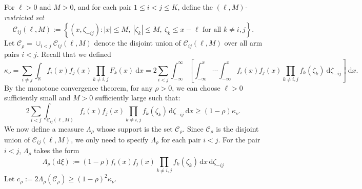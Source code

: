 \documentclass[10pt]{article}
\newcommand{\dd}{\mathrm{d}}
\theoremstyle{plain}
\begin{document}
For $\ell > 0$ and $M > 0$, and for each pair $1\leq i < j \leq K$, define the {\em $(\ell,M)$-restricted set}
$$ \mathcal{C}_{ij}(\ell, M) := \left\{ (x, \zeta_{-ij}) : |x| \le M,\ |\zeta_k| \le M,\ \zeta_k \le x - \ell \text{ for all } k \neq i,j \right\}. $$
Let $\mathcal{C}_\rho = \cup_{i<j}\mathcal{C}_{ij}(\ell, M)$ denote the disjoint union of $\mathcal{C}_{ij}(\ell, M)$ over all arm pairs $i < j$. Recall that we defined
$$\kappa_\nu = \sum_{i\neq j}\int_{\mathbb R}f_i(x)f_j(x)\prod_{k\neq i,j}F_k(x) \ \dd x 
=2\sum_{i<j}\int_{-\infty}^{\infty}\left[\int_{-\infty}^{x}\cdots\int_{-\infty}^{x}f_i(x)f_j(x)\prod_{k\neq i,j}f_k(\zeta_k) \ \dd\zeta_{-ij}\right] \ \dd x.$$
By the monotone convergence theorem, for any  $\rho >0$, we can choose $\ell > 0$ sufficiently small and $M > 0$ sufficiently large such that:
$$ 2\sum_{i<j} \int_{\mathcal{C}_{ij}(\ell,M)} f_i(x)f_j(x)\prod_{k \neq i,j} f_k(\zeta_k) \,\dd\zeta_{-ij}\,\dd x \ge (1-\rho)\kappa_\nu. $$
We now define a   measure $\Lambda_\rho$ whose support is the set $\mathcal{C}_\rho$. Since $\mathcal{C}_\rho$ is the disjoint union of $\mathcal{C}_{ij}(\ell,M)$, we only need to specify $\Lambda_\rho$ for each pair $i<j$.  For the pair $i < j$, $\Lambda_\rho$ takes the form
\begin{equation} \label{eq:Lambda-rho}
\Lambda_\rho(\dd\xi) := (1-\rho) f_i(x)f_j(x) \prod_{k \neq i,j} f_k(\zeta_k) \,\dd x\,\dd\zeta_{-ij}
\end{equation}
Let $c_\rho := 2\Lambda_\rho(\mathcal{C}_\rho) \ge (1-\rho)^2\kappa_\nu$.
\end{document}
